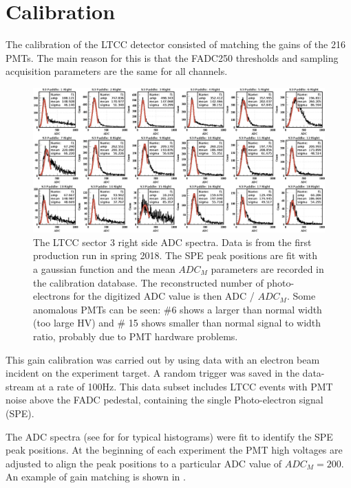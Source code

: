 \section{Calibration}

The calibration of the LTCC detector consisted of matching the gains of the 216 PMTs.
The main reason for this is that the FADC250 thresholds and sampling acquisition parameters are the same for all channels.

\begin{figure}
	\centering
	\includegraphics[width=2.1\columnwidth,keepaspectratio]{img/spe.png}
	\caption{The LTCC sector 3 right side ADC spectra. Data is from the first production run in spring 2018.
             The SPE peak positions are fit with a gaussian function and the mean $ADC_M$ parameters are recorded in the calibration database.
             The reconstructed number of photo-electrons for the digitized ADC value is then ADC / $ADC_M$. Some anomalous PMTs can be seen:
             \#6 shows a larger than normal width (too large HV) and \# 15 shows smaller than normal signal to width ratio, probably due to PMT
             hardware problems.}
	\label{fig:speCalibration}
\end{figure}

This gain calibration was carried out by using data with an electron beam incident on the experiment target.
A random trigger was saved in the data-stream at a rate of 100Hz.
This data subset includes LTCC events with PMT noise above the FADC pedestal, containing the single Photo-electron signal (SPE).

The ADC spectra (see for  for typical histograms) were fit to identify the SPE peak positions.
At the beginning of each experiment the PMT high voltages are adjusted to align the peak positions
to a particular ADC value of $ADC_M = 200$. An example of gain matching is shown in .


